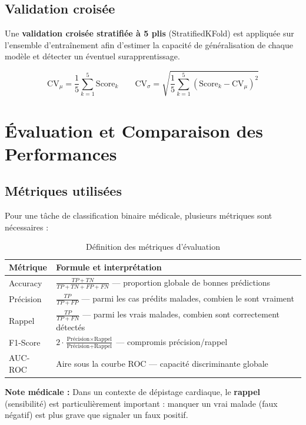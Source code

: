 \documentclass[12pt,a4paper]{article}
\begin{document}
		\subsection{Validation croisée}

			Une \textbf{validation croisée stratifiée à 5 plis} (StratifiedKFold) est appliquée sur l'ensemble d'entraînement afin d'estimer la capacité de généralisation de chaque modèle et détecter un éventuel surapprentissage.

			$$\text{CV}_\mu = \frac{1}{5}\sum_{k=1}^{5} \text{Score}_k \qquad \text{CV}_\sigma = \sqrt{\frac{1}{5}\sum_{k=1}^{5}(\text{Score}_k - \text{CV}_\mu)^2}$$
	\section{Évaluation et Comparaison des Performances}

		\subsection{Métriques utilisées}

			Pour une tâche de classification binaire médicale, plusieurs métriques sont nécessaires :

			\begin{table}[H]
			\centering
			\caption{Définition des métriques d'évaluation}
			\label{tab:metrics}
			\begin{tabularx}{\textwidth}{lX}
				\toprule
				\textbf{Métrique} & \textbf{Formule et interprétation} \\
				\midrule
				Accuracy    & $\frac{TP+TN}{TP+TN+FP+FN}$ — proportion globale de bonnes prédictions \\[6pt]
				Précision   & $\frac{TP}{TP+FP}$ — parmi les cas prédits malades, combien le sont vraiment \\[6pt]
				Rappel      & $\frac{TP}{TP+FN}$ — parmi les vrais malades, combien sont correctement détectés \\[6pt]
				F1-Score    & $2 \cdot \frac{\text{Précision} \times \text{Rappel}}{\text{Précision} + \text{Rappel}}$ — compromis précision/rappel \\[6pt]
				AUC-ROC     & Aire sous la courbe ROC — capacité discriminante globale \\
				\bottomrule
			\end{tabularx}
			\end{table}

			\textbf{Note médicale :} Dans un contexte de dépistage cardiaque, le \textbf{rappel} (sensibilité) est particulièrement important : manquer un vrai malade (faux négatif) est plus grave que signaler un faux positif.
\end{document}
